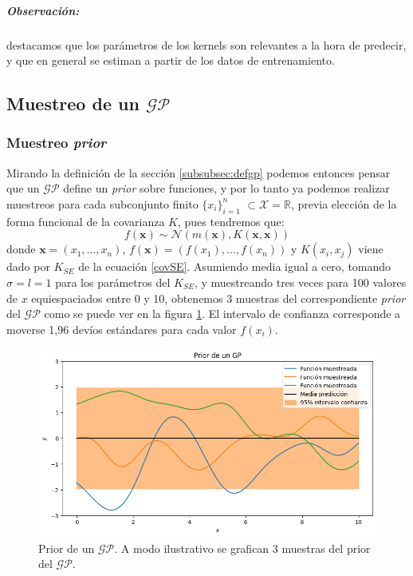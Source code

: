 \documentclass[a4paper]{article}
\newcommand{\gp}{\ensuremath{\mathcal{GP}}}
\begin{document}
\subparagraph{Observación:} destacamos que los parámetros de los kernels son relevantes a la hora de predecir, y que en general se estiman a partir de los datos de entrenamiento.



\subsection{Muestreo de un $\gp$}
\label{subsec:muestreoGP}

\subsubsection{Muestreo \emph{prior}}
Mirando la definición de la sección \ref{subsubsec:defgp} podemos entonces pensar que un $\gp$ define un \emph{prior} sobre funciones, y por lo tanto ya podemos realizar muestreos para cada subconjunto finito $\{x_i\}_{i=1}^n$ $\subset \mathcal{X}=\mathbb{R}$, previa elección de la forma funcional de la covarianza $K$, pues tendremos que:
$$ 	f(\mathbf{x}) \sim \mathcal{N}(m(\mathbf{x}), K(\mathbf{x},\mathbf{x})) $$
donde $\mathbf{x}=(x_1,\dots,x_n)$, $f(\mathbf{x}) = (f(x_1),\dots,f(x_n))$ y $K(x_i,x_j)$ viene dado por $K_{SE}$ de la ecuación \ref{covSE}. Asumiendo media igual a cero, tomando $\sigma=l=1$ para los parámetros del $K_{SE}$, y muestreando tres veces para 100 valores de $x$ equiespaciados entre 0 y 10, obtenemos 3 muestras del correspondiente \emph{prior} del $\gp$ como se puede ver en la figura \ref{fig:gprior}. El intervalo de confianza corresponde a moverse 1,96 devíos estándares para cada valor $f(x_i)$.
\begin{figure}[h]
	\centering
	\includegraphics[trim={0cm 0cm 0cm 0cm},clip,width=\textwidth]{gpprior.png}
	\caption{Prior de un $\gp$. A modo ilustrativo se grafican 3 muestras del prior del $\gp$.}
	\label{fig:gprior}
\end{figure}
\end{document}
